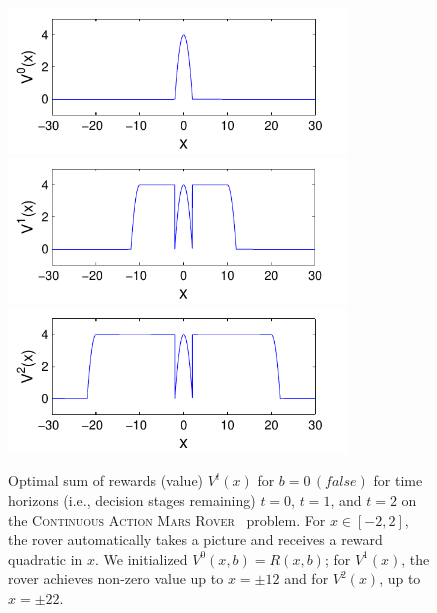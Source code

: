 \documentclass[twoside,11pt]{article}
\newcommand{\MarsRover}{\textsc{Mars Rover }}
\newcommand{\false}{\mathit{false}}
\begin{document}
\begin{figure}[t!]
\begin{minipage}[b]{0.47\linewidth}
\includegraphics[width=0.8\textwidth]{Figures1/camdp/v1_mr.pdf}\\
\vspace{-2mm}
\includegraphics[width=0.8\textwidth]{Figures1/camdp/v2_mr.pdf}\\
\vspace{-2mm}
\includegraphics[width=0.8\textwidth]{Figures1/camdp/v3_mr.pdf}
\vspace{-3mm}

\caption{\footnotesize Optimal sum of rewards (value) 
$V^t(x)$ for $b = 0 \, 
(\false)$ for time horizons (i.e., decision stages remaining) $t=0$,
$t=1$, and $t=2$ on the \textsc{Continuous Action}  \MarsRover\ problem.  For $x \in [-2,2]$, the
rover automatically takes a picture and receives a reward quadratic in
$x$.  We initialized $V^0(x,b) = R(x,b)$; for $V^1(x)$, the rover achieves
non-zero value up to $x = \pm 12$ and for 
$V^2(x)$, up to $x = \pm 22$.}
\label{fig:opt_graph}


\end{minipage}
\end{figure}
\end{document}

